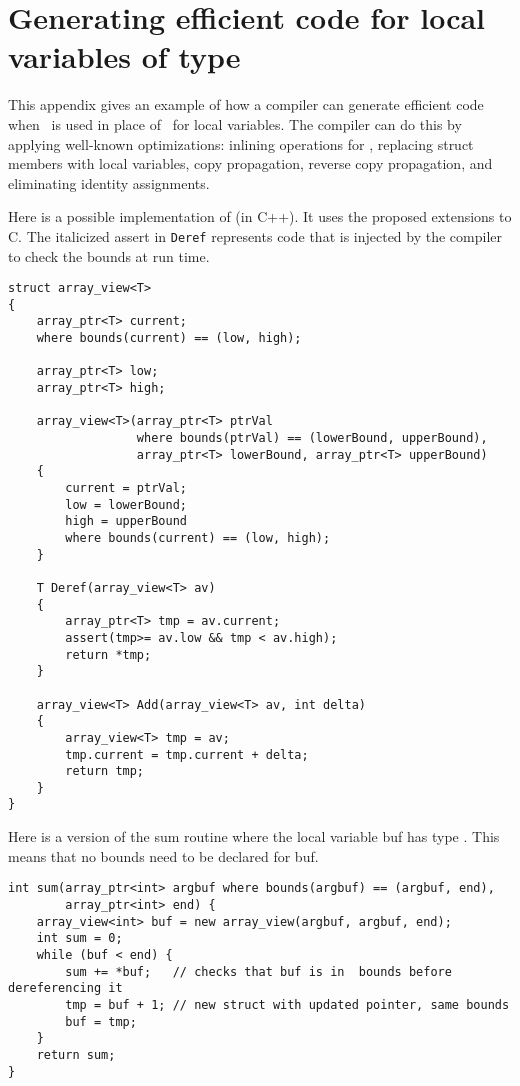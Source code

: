 
\chapter{Generating efficient code for local variables of type \arrayview}

This appendix gives an example of how a compiler can generate efficient
code when \arrayview\ is used in place of \arrayptr\
for local variables. The compiler can do this by applying well-known
optimizations: inlining operations for \arrayview , replacing
struct members with local variables, copy propagation, reverse copy
propagation, and eliminating identity assignments.

Here is a possible implementation of \arrayviewT (in C++). It
uses the proposed extensions to C. The italicized assert in
\texttt{Deref} represents code that is injected by the compiler to check
the bounds at run time.

\begin{verbatim}
struct array_view<T>
{
    array_ptr<T> current;
    where bounds(current) == (low, high);

    array_ptr<T> low;
    array_ptr<T> high;
      
    array_view<T>(array_ptr<T> ptrVal 
                  where bounds(ptrVal) == (lowerBound, upperBound),
                  array_ptr<T> lowerBound, array_ptr<T> upperBound)
    {
        current = ptrVal;
        low = lowerBound;
        high = upperBound
        where bounds(current) == (low, high);
    }

    T Deref(array_view<T> av) 
    {
        array_ptr<T> tmp = av.current;
        assert(tmp>= av.low && tmp < av.high);
        return *tmp;
    }

    array_view<T> Add(array_view<T> av, int delta) 
    {
        array_view<T> tmp = av;
        tmp.current = tmp.current + delta;
        return tmp;
    }
}
\end{verbatim}

Here is a version of the sum routine where the local variable buf has
type \arrayview. This means that no bounds need to be declared
for buf.

\begin{verbatim}
int sum(array_ptr<int> argbuf where bounds(argbuf) == (argbuf, end), 
        array_ptr<int> end) {
    array_view<int> buf = new array_view(argbuf, argbuf, end);
    int sum = 0;
    while (buf < end) {
        sum += *buf;   // checks that buf is in  bounds before dereferencing it        
        tmp = buf + 1; // new struct with updated pointer, same bounds
        buf = tmp;
    }
    return sum;
}
\end{verbatim}

